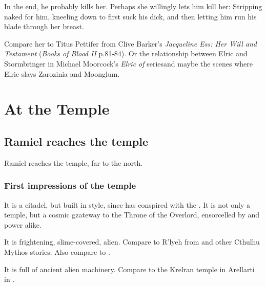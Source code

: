 In the end, he probably kills her. Perhaps she willingly lets him kill her: Stripping naked for him, kneeling down to first suck his dick, and then letting him run his blade through her breast. 

Compare her to Titus Pettifer from Clive Barker's \emph{Jacqueline Ess: Her Will and Testament} (\emph{Books of Blood II} p.81-84). Or the relationship between Elric and Stormbringer in Michael Moorcock's \emph{Elric of \Melnibone} series\dash and maybe the scenes where Elric slays Zarozinia and Moonglum. 















\section{At the Temple}
\subsection{Ramiel reaches the temple}
Ramiel reaches the temple, far to the north. 





\subsubsection{First impressions of the temple}
It is a \Mystraacht{} citadel, but built in \ophidian{} style, since \Mystraacht{} has conspired with the \ophidians. 
It is not only a temple, but a cosmic gzateway to the Throne of the \Mystraacht{} Overlord, ensorcelled by \resphan{} and \ophidian{} power alike. 

It is frightening, slime-covered, alien. 
Compare to R'lyeh from \cite{HPLovecraft:TheCallofCthulhu} and other Cthulhu Mythos stories. 
Also compare to \cite[p.22--25]{TanakaHirofumi:TheSecretMemoiroftheMissionary}.

It is full of ancient alien machinery. 
Compare to the Krelran temple in Arellarti in \cite[p.49]{KarlEdwardWagner:Bloodstone}. 



